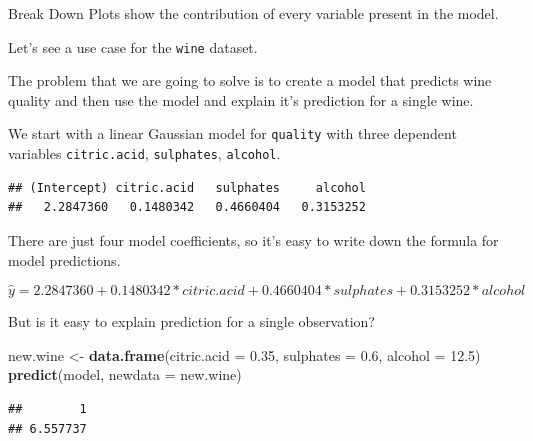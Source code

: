 \documentclass[]{book}
\newenvironment{Shaded}{\begin{snugshade}}{\end{snugshade}}
\newcommand{\KeywordTok}[1]{\textcolor[rgb]{0.13,0.29,0.53}{\textbf{#1}}}
\newcommand{\DataTypeTok}[1]{\textcolor[rgb]{0.13,0.29,0.53}{#1}}
\newcommand{\FloatTok}[1]{\textcolor[rgb]{0.00,0.00,0.81}{#1}}
\newcommand{\StringTok}[1]{\textcolor[rgb]{0.31,0.60,0.02}{#1}}
\newcommand{\OperatorTok}[1]{\textcolor[rgb]{0.81,0.36,0.00}{\textbf{#1}}}
\newcommand{\NormalTok}[1]{#1}
\theoremstyle{definition}
\theoremstyle{definition}
\theoremstyle{definition}
\theoremstyle{remark}
\begin{document}
Break Down Plots show the contribution of every variable present in the
model.

Let's see a use case for the \texttt{wine} dataset.

The problem that we are going to solve is to create a model that
predicts wine quality and then use the model and explain it's prediction
for a single wine.

We start with a linear Gaussian model for \texttt{quality} with three
dependent variables \texttt{citric.acid}, \texttt{sulphates},
\texttt{alcohol}.

\begin{Shaded}
\end{Shaded}

\begin{verbatim}
## (Intercept) citric.acid   sulphates     alcohol 
##   2.2847360   0.1480342   0.4660404   0.3153252
\end{verbatim}

There are just four model coefficients, so it's easy to write down the
formula for model predictions.

\[
\hat y = 2.2847360  + 0.1480342 *  citric.acid + 0.4660404    * sulphates + 0.3153252 * alcohol
\]

But is it easy to explain prediction for a single observation?

\begin{Shaded}
\begin{Highlighting}[]
\NormalTok{new.wine <-}\StringTok{ }\KeywordTok{data.frame}\NormalTok{(}\DataTypeTok{citric.acid =} \FloatTok{0.35}\NormalTok{,}
                       \DataTypeTok{sulphates =} \FloatTok{0.6}\NormalTok{,}
                       \DataTypeTok{alcohol =} \FloatTok{12.5}\NormalTok{)}
\KeywordTok{predict}\NormalTok{(model, }\DataTypeTok{newdata =}\NormalTok{ new.wine)}
\end{Highlighting}
\end{Shaded}

\begin{verbatim}
##        1 
## 6.557737
\end{verbatim}
\end{document}
